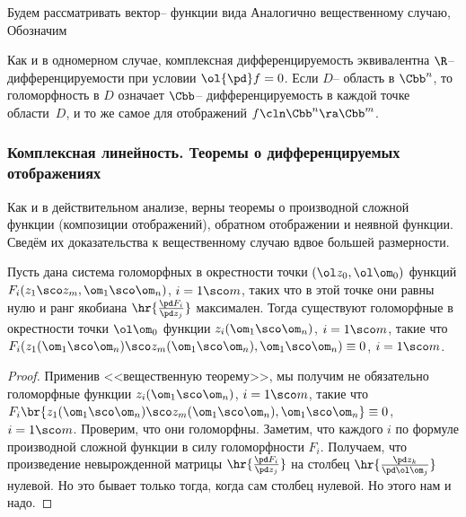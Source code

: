\documentclass[a4paper]{article}
\begin{document}
Будем рассматривать вектор-- функции вида
Аналогично вещественному случаю,
Обозначим

Как и в одномерном случае, комплексная дифференцируемость эквивалентна $\R$-- дифференцируемости при условии $\ol{\pd}f=0$.
Если $D$-- область в $\Cbb^n$, то голоморфность в $D$ означает $\Cbb$-- дифференцируемость в каждой точке области~$D$,
и то же самое для отображений $f\cln \Cbb^n \ra \Cbb^m$.

\subsubsection{Комплексная линейность. Теоремы о дифференцируемых отображениях}

Как и в действительном анализе, верны теоремы о производной сложной функции (композиции отображений),
обратном отображении и неявной функции. Сведём их доказательства к вещественному случаю вдвое большей размерности.

\begin{theorem}
Пусть дана система голоморфных в окрестности точки $(\ol z_0, \ol \om_0)$
функций $F_i(z_1\sco z_m, \om_1\sco \om_n)$, $i = 1\sco m$,
таких что в этой точке они равны нулю и ранг якобиана $\hr{\frac{\pd F_i}{\pd z_j}}$
максимален. Тогда существуют голоморфные в окрестности точки $\ol \om_0$ функции
$z_i(\om_1\sco \om_n)$, $i = 1\sco m$, такие что
$F_i(z_1(\om_1\sco \om_n)\sco z_m(\om_1\sco \om_n), \om_1\sco \om_n)\equiv0$, $i = 1\sco m$.
\end{theorem}
\begin{proof}
Применив <<вещественную теорему>>, мы получим не обязательно голоморфные функции
$z_i(\om_1\sco \om_n)$, $i = 1\sco m$, такие что
$F_i\br{z_1(\om_1\sco \om_n)\sco z_m(\om_1\sco \om_n), \om_1\sco \om_n}\equiv0$, $i = 1\sco m$.
Проверим, что они голоморфны. Заметим, что каждого $i$ по формуле производной сложной функции
в силу голоморфности $F_i$. Получаем, что произведение невырожденной матрицы $\hr{\frac{\pd F_i}{\pd z_j}}$
на столбец $\hr{\frac{\pd z_k}{\pd \ol \om_j}}$ нулевой. Но это бывает только тогда, когда сам столбец
нулевой. Но этого нам и надо.
\end{proof}
\end{document}

